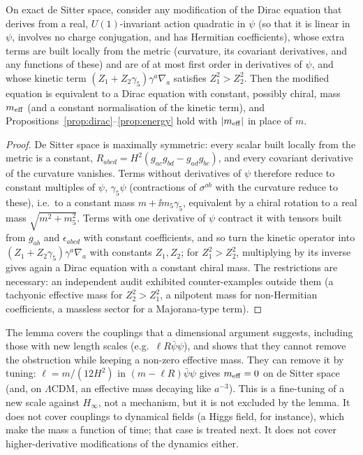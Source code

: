 \begin{lemma}
\label{lem:coupling}
On exact de Sitter space, consider any modification of the Dirac equation that derives from a real, $U(1)$-invariant action quadratic in $\psi$ (so that it is linear in $\psi$, involves no charge conjugation, and has Hermitian coefficients), whose extra terms are built locally from the metric (curvature, its covariant derivatives, and any functions of these) and are of at most first order in derivatives of $\psi$, and whose kinetic term $(Z_{1}+Z_{2}\gamma_{5})\gamma^{a}\nabla_{a}$ satisfies $Z_{1}^{2}>Z_{2}^{2}$. Then the modified equation is equivalent to a Dirac equation with constant, possibly chiral, mass $m_{\rm eff}$ (and a constant normalisation of the kinetic term), and Propositions~\ref{prop:dirac}--\ref{prop:energy} hold with $|m_{\rm eff}|$ in place of $m$.
\end{lemma}
\begin{proof}
De Sitter space is maximally symmetric: every scalar built locally from the metric is a constant, $R_{abcd}=H^{2}(g_{ac}g_{bd}-g_{ad}g_{bc})$, and every covariant derivative of the curvature vanishes. Terms without derivatives of $\psi$ therefore reduce to constant multiples of $\psi$, $\gamma_{5}\psi$ (contractions of $\sigma^{ab}$ with the curvature reduce to these), i.e.\ to a constant mass $m+\ii m_{5}\gamma_{5}$, equivalent by a chiral rotation to a real mass $\sqrt{m^{2}+m_{5}^{2}}$. Terms with one derivative of $\psi$ contract it with tensors built from $g_{ab}$ and $\epsilon_{abcd}$ with constant coefficients, and so turn the kinetic operator into $(Z_{1}+Z_{2}\gamma_{5})\gamma^{a}\nabla_{a}$ with constants $Z_{1},Z_{2}$; for $Z_{1}^{2}>Z_{2}^{2}$, multiplying by its inverse gives again a Dirac equation with a constant chiral mass. The restrictions are necessary: an independent audit exhibited counter-examples outside them (a tachyonic effective mass for $Z_{2}^{2}>Z_{1}^{2}$, a nilpotent mass for non-Hermitian coefficients, a massless sector for a Majorana-type term).
\end{proof}

The lemma covers the couplings that a dimensional argument suggests, including those with new length scales (e.g.\ $\ell R\bar\psi\psi$), and shows that they cannot remove the obstruction while keeping a non-zero effective mass. They can remove it by tuning: $\ell=m/(12H^{2})$ in $(m-\ell R)\bar\psi\psi$ gives $m_{\rm eff}=0$ on de Sitter space (and, on $\Lambda$CDM, an effective mass decaying like $a^{-3}$). This is a fine-tuning of a new scale against $H_{\infty}$, not a mechanism, but it is not excluded by the lemma. It does not cover couplings to dynamical fields (a Higgs field, for instance), which make the mass a function of time; that case is treated next. It does not cover higher-derivative modifications of the dynamics either.


